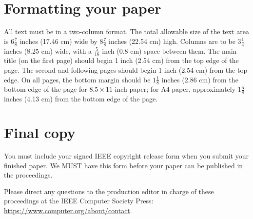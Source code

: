 \documentclass[10pt,twocolumn,letterpaper]{article}
\begin{document}

    \section{Formatting your paper}
    \label{sec:formatting}

    All text must be in a two-column format.
    The total allowable size of the text area is $6\frac78$ inches (17.46 cm) wide by $8\frac78$ inches (22.54 cm) high.
    Columns are to be $3\frac14$ inches (8.25 cm) wide, with a $\frac{5}{16}$ inch (0.8 cm) space between them.
    The main title (on the first page) should begin 1 inch (2.54 cm) from the top edge of the page.
    The second and following pages should begin 1 inch (2.54 cm) from the top edge.
    On all pages, the bottom margin should be $1\frac{1}{8}$ inches (2.86 cm) from the bottom edge of the page for $8.5 \times 11$-inch paper;
    for A4 paper, approximately $1\frac{5}{8}$ inches (4.13 cm) from the bottom edge of the
    page.


    \section{Final copy}

    You must include your signed IEEE copyright release form when you submit your finished paper.
    We MUST have this form before your paper can be published in the proceedings.

    Please direct any questions to the production editor in charge of these proceedings at the IEEE Computer Society Press:
    \url{https://www.computer.org/about/contact}.


        {\small
    
    
    }
\end{document}

